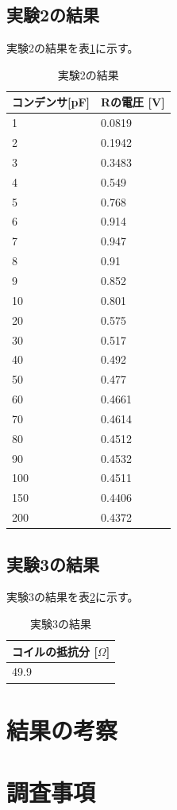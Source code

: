 \documentclass[11pt,a4paper,fleqn]{jsarticle}
\begin{document}
\subsection{実験2の結果}
実験2の結果を表\ref{cal:result2}に示す。
\begin{table}[!h]
\centering
\caption{実験2の結果}
\label{cal:result2}
\begin{tabular}{|l|l|}
\hline
コンデンサ{[}pF{]} & Rの電圧 {[}V{]} \\ \hline
1             & 0.0819       \\ \hline
2             & 0.1942       \\ \hline
3             & 0.3483       \\ \hline
4             & 0.549        \\ \hline
5             & 0.768        \\ \hline
6             & 0.914        \\ \hline
7             & 0.947        \\ \hline
8             & 0.91         \\ \hline
9             & 0.852        \\ \hline
10            & 0.801        \\ \hline
20            & 0.575        \\ \hline
30            & 0.517        \\ \hline
40            & 0.492        \\ \hline
50            & 0.477        \\ \hline
60            & 0.4661       \\ \hline
70            & 0.4614       \\ \hline
80            & 0.4512       \\ \hline
90            & 0.4532       \\ \hline
100           & 0.4511       \\ \hline
150           & 0.4406       \\ \hline
200           & 0.4372       \\ \hline
\end{tabular}
\end{table}
\subsection{実験3の結果}
実験3の結果を表\ref{cal:result3}に示す。
\begin{table}[!h]
\centering
\caption{実験3の結果}
\label{cal:result3}
\begin{tabular}{|l|}
\hline
コイルの抵抗分 {[}$\Omega${]} \\ \hline \hline
49.9            \\ \hline
\end{tabular}
\end{table}
\section{結果の考察}
%
\section{調査事項}
%
\end{document}
